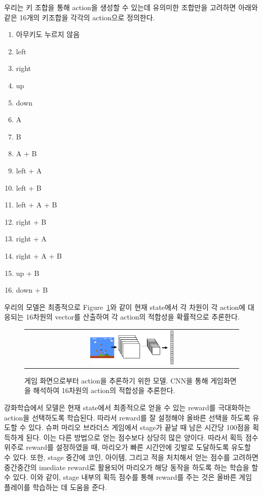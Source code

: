우리는 키 조합을 통해 action을 생성할 수 있는데 유의미한 조합만을 고려하면 아래와 같은 16개의 키조합을 각각의 action으로 정의한다.
\begin{enumerate}
	\item 아무키도 누르지 않음
	\item left
	\item right
	\item up
	\item down
	\item A
	\item B
	\item A + B
	\item left + A
	\item left + B
	\item left + A + B
	\item right + B
	\item right + A
	\item right + A + B
	\item up + B
	\item down + B
\end{enumerate}
우리의 모델은 최종적으로 Figure~\ref{fig:overview}와 같이 현재 state에서 각 차원이 각 action에 대응되는 16차원의 vector를 산출하여 각 action의 적합성을 확률적으로 추론한다.
\begin{figure}[]
\begin{center}
\begin{tabular}{c}
     \includegraphics[width=0.4\textwidth]{FIG/overview.pdf} \\
\end{tabular}
\caption{
	게임 화면으로부터 action을 추론하기 위한 모델. CNN을 통해 게임화면을 해석하여 16차원의 action의 적합성을 추론한다.
}
\label{fig:overview}
\end{center}
\end{figure}

강화학습에서 모델은 현재 state에서 최종적으로 얻을 수 있는 reward를 극대화하는 action을 선택하도록 학습된다.
따라서 reward를 잘 설정해야 올바른 선택을 하도록 유도할 수 있다.
슈퍼 마리오 브라더스 게임에서 stage가 끝날 때 남은 시간당 100점을 획득하게 된다.
이는 다른 방법으로 얻는 점수보다 상당히 많은 양이다.
따라서 획득 점수 위주로 reward를 설정하였을 때, 마리오가 빠른 시간안에 깃발로 도달하도록 유도할 수 있다.
또한, stage 중간에 코인, 아이템, 그리고 적을 처치해서 얻는 점수를 고려하면 중간중간의 imediate reward로 활용되어 마리오가 해당 동작을 하도록 하는 학습을 할 수 있다.
이와 같이, stage 내부의 획득 점수를 통해 reward를 주는 것은 올바른 게임 플레이를 학습하는 데 도움을 준다.

